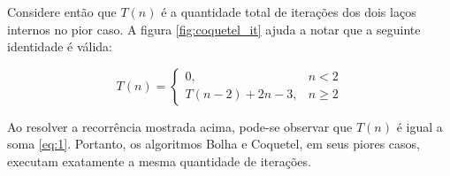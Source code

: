 Considere então que $T(n)$ é a quantidade total de iterações dos dois laços internos no pior caso. A figura \ref{fig:coquetel_it} ajuda a notar que a seguinte identidade é válida:

\[
T(n) = 
  \begin{cases}
      0,              & n < 2    \\
      T(n-2) + 2n - 3, & n \geq 2 
  \end{cases}
\]

Ao resolver a recorrência mostrada acima, pode-se observar que $T(n)$ é igual a soma \ref{eq:1}. Portanto, os algoritmos Bolha e Coquetel, em seus piores casos, executam exatamente a mesma quantidade de iterações.

